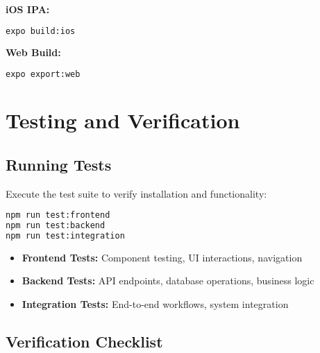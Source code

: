 \documentclass[11pt,a4paper]{article}
\begin{document}
\textbf{iOS IPA:}
\begin{lstlisting}[language=bash]
expo build:ios
\end{lstlisting}

\textbf{Web Build:}
\begin{lstlisting}[language=bash]
expo export:web
\end{lstlisting}

\section{Testing and Verification}

\subsection{Running Tests}

Execute the test suite to verify installation and functionality:

\begin{lstlisting}[language=bash]
npm run test:frontend
npm run test:backend
npm run test:integration
\end{lstlisting}

\begin{tcolorbox}[colback=lightgray,colframe=black,title=\textbf{Test Suite Overview}]
\begin{itemize}[leftmargin=*]
    \item \textbf{Frontend Tests:} Component testing, UI interactions, navigation
    \item \textbf{Backend Tests:} API endpoints, database operations, business logic
    \item \textbf{Integration Tests:} End-to-end workflows, system integration
\end{itemize}
\end{tcolorbox}

\subsection{Verification Checklist}
\end{document}
